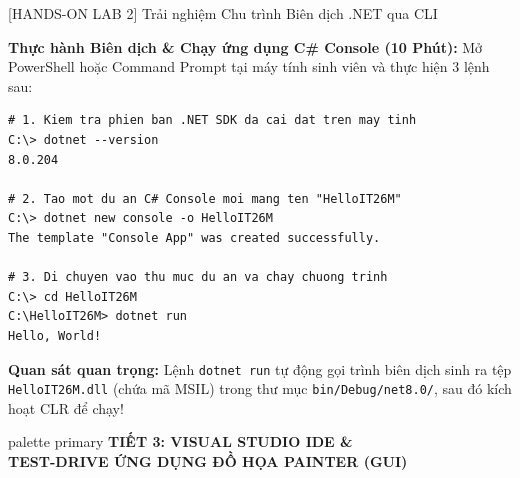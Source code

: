 \documentclass[aspectratio=169, 10pt]{beamer}
\begin{document}
\begin{frame}[fragile]{[HANDS-ON LAB 2] Trải nghiệm Chu trình Biên dịch .NET qua CLI}
  \begin{exampleblock}{\textbf{Thực hành Biên dịch \& Chạy ứng dụng C\# Console (10 Phút):}}
    Mở PowerShell hoặc Command Prompt tại máy tính sinh viên và thực hiện 3 lệnh sau:
  \end{exampleblock}
\begin{lstlisting}[style=terminalStyle]
# 1. Kiem tra phien ban .NET SDK da cai dat tren may tinh
C:\> dotnet --version
8.0.204

# 2. Tao mot du an C# Console moi mang ten "HelloIT26M"
C:\> dotnet new console -o HelloIT26M
The template "Console App" was created successfully.

# 3. Di chuyen vao thu muc du an va chay chuong trinh
C:\> cd HelloIT26M
C:\HelloIT26M> dotnet run
Hello, World!
\end{lstlisting}
  \begin{block}{\textbf{Quan sát quan trọng:}}
    Lệnh \texttt{dotnet run} tự động gọi trình biên dịch sinh ra tệp \texttt{HelloIT26M.dll} (chứa mã MSIL) trong thư mục \texttt{bin/Debug/net8.0/}, sau đó kích hoạt CLR để chạy!
  \end{block}
\end{frame}

\begin{frame}
  \vfill
  \centering
  \begin{beamercolorbox}[sep=8pt,center,shadow=true,rounded=true]{palette primary}
    \Huge \textbf{TIẾT 3: VISUAL STUDIO IDE \&}\\[2mm]
    \Large \textbf{TEST-DRIVE ỨNG DỤNG ĐỒ HỌA PAINTER (GUI)}
  \end{beamercolorbox}
  \vfill
\end{frame}
\end{document}
